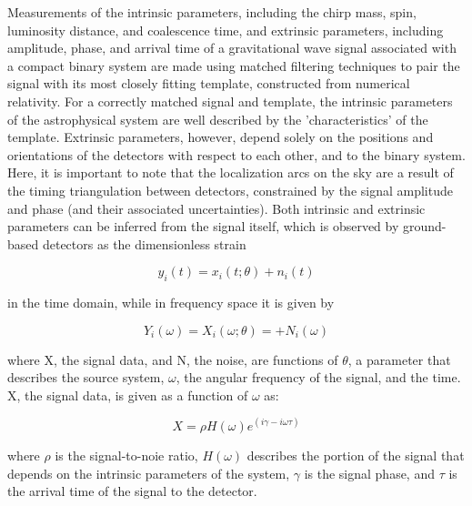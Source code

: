 \documentclass{article}
\begin{document}
Measurements of the intrinsic parameters, including the chirp mass, spin, luminosity distance, and coalescence time, and extrinsic parameters, including amplitude, phase, and arrival time of a gravitational wave signal associated with a compact binary system are made using matched filtering techniques to pair the signal with its most closely fitting template, constructed from numerical relativity.  For a correctly matched signal and template, the intrinsic parameters of the astrophysical system are well described by the 'characteristics' of the template.  Extrinsic parameters, however, depend solely on the positions and orientations of the detectors with respect to each other, and to the binary system.  Here, it is important to note that the localization arcs on the sky are a result of the timing triangulation between detectors, constrained by the signal amplitude and phase (and their associated uncertainties).  Both intrinsic and extrinsic parameters can be inferred from the signal itself, which is observed by ground-based detectors as the dimensionless strain

\begin{equation}    y_i(t) = x_i(t;\theta) + n_i(t) \end{equation}

in the time domain, while in frequency space it is given by 

\begin{equation} Y_i(\omega) = X_i(\omega; \theta) = + N_i(\omega) \end{equation}

where X, the signal data, and N, the noise, are functions of $\theta$, a parameter that describes the source system, $\omega$, the angular frequency of the signal, and the time. X, the signal data, is given as a function of $\omega$ as:

\begin{equation} X = \rho H(\omega)e^{(i\gamma - i\omega\tau)} \end{equation}

where $\rho$ is the signal-to-noie ratio, $H(\omega)$ describes the portion of the signal that depends on the intrinsic parameters of the system, $\gamma$ is the signal phase, and $\tau$ is the arrival time of the signal to the detector.
\end{document}
